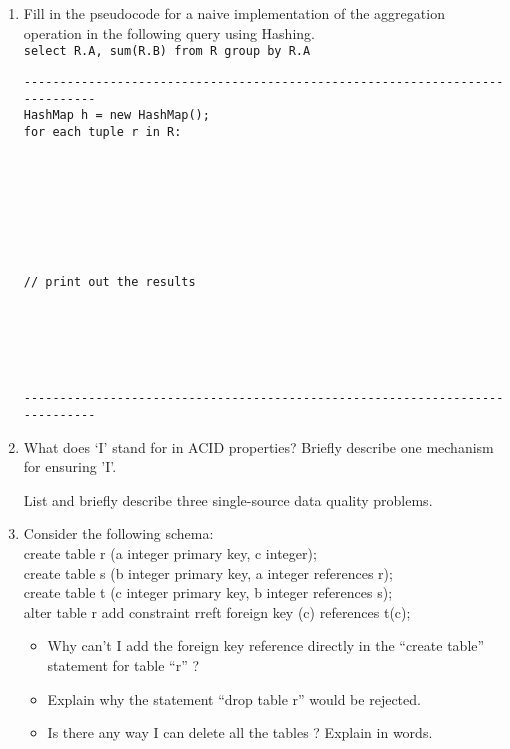 \documentclass[11pt]{article}
\newcommand{\answer}[2]{\noindent {\bf Answer:} #2}
\renewcommand{\answer}[2]{\vspace{#1}}
\begin{document}
\begin{enumerate}
\item Fill in the pseudocode for a naive implementation of the aggregation operation in the following query using Hashing.  \\[2pt]
{\tt select R.A, sum(R.B) from R group by R.A}

\begin{verbatim}
-----------------------------------------------------------------------------
HashMap h = new HashMap();
for each tuple r in R:
    







// print out the results






-----------------------------------------------------------------------------
\end{verbatim}

\item What does `I' stand for in ACID properties? Briefly describe one mechanism for ensuring 'I'. 

\answer{2.5in}

\item List and briefly describe three single-source data quality problems.

\answer{2.5in}{ }

\item Consider the following schema: \\
        create table r (a integer primary key, c integer); \\
        create table s (b integer primary key, a integer references r); \\
        create table t (c integer primary key, b integer references s); \\
        alter table r add constraint rreft foreign key (c) references t(c);

        \begin{itemize}
            \item Why can't I add the foreign key reference directly in the ``create table'' statement for table ``r'' ?

                \answer{.6in}{The table ``t'' hasn't been created yet.}
            \item Explain why the statement ``drop table r'' would be rejected.

                \answer{.6in}{Because there is a referential integrity constraint from ``s''.}
            \item Is there any way I can delete all the tables ? Explain in words.


\end{itemize}
\end{enumerate}
\end{document}
